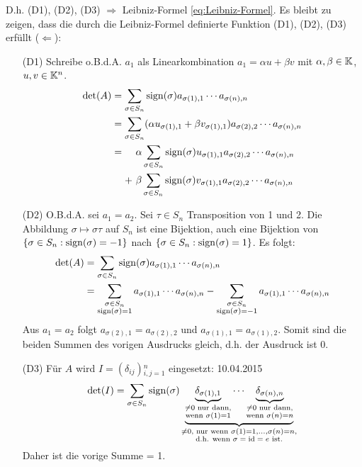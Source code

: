 \noindent D.h. (D1), (D2), (D3) $ \Rightarrow $ Leibniz-Formel \eqref{eq:Leibniz-Formel}. Es bleibt zu zeigen, dass die durch die Leibniz-Formel definierte Funktion (D1), (D2), (D3) erfüllt ($ \Leftarrow $):
\begin{itemize}
	\item[(D1)]
		Schreibe o.B.d.A. $ a_1 $ als Linearkombination $ a_1 = \alpha u + \beta v $ mit $ \alpha, \beta \in \mathbb K $, $ u,v \in \mathbb K^n $.
		\begin{align*}
			\det(A) &= \sum_{\sigma \in S_n} \operatorname{sign}(\sigma) a_{\sigma(1),1} \cdots a_{\sigma(n),n} \\
			&= \sum_{\sigma \in S_n} (\alpha u_{\sigma(1),1} + \beta v_{\sigma(1),1}) a_{\sigma(2),2} \cdots a_{\sigma(n),n} \\
			&= \begin{aligned}[t]
				&\ \alpha \sum_{\sigma \in S_n} \operatorname{sign}(\sigma) u_{\sigma(1),1} a_{\sigma(2),2} \cdots a_{\sigma(n),n} \\
				+ &\ \beta \sum_{\sigma \in S_n} \operatorname{sign}(\sigma) v_{\sigma(1),1} a_{\sigma(2),2} \cdots a_{\sigma(n),n}
			\end{aligned}
		\end{align*}
	\item[(D2)]
		O.B.d.A. sei $ a_1 = a_2 $. Sei $ \tau \in S_n $ Transposition von 1 und 2. Die Abbildung $ \sigma \mapsto \sigma\tau $ auf $ S_n $ ist eine Bijektion, auch eine Bijektion von $ \{ \sigma \in S_n : \operatorname{sign}(\sigma) = -1 \} $ nach $ \{ \sigma \in S_n : \operatorname{sign}(\sigma) = 1 \} $. Es folgt:
		\begin{align*}
			\det(A) &= \sum_{\sigma \in S_n} \operatorname{sign}(\sigma) a_{\sigma(1),1} \cdots a_{\sigma(n),n} \\
			&= \sum_{\substack{\sigma \in S_n \\ \operatorname{sign}(\sigma) = 1}} a_{\sigma(1),1} \cdots a_{\sigma(n),n} - \sum_{\substack{\sigma \in S_n \\ \operatorname{sign}(\sigma) = -1}} a_{\sigma(1),1} \cdots a_{\sigma(n),n}
		\end{align*}
		Aus $ a_1 = a_2 $ folgt $ a_{\sigma(2),1} = a_{\sigma(2),2} $ und $ a_{\sigma(1),1} = a_{\sigma(1),2} $. Somit sind die beiden Summen des vorigen Ausdrucks gleich, d.h. der Ausdruck ist 0.
	\item[(D3)]
		Für $ A $ wird $ I = (\delta_{ij}){}_{i,j=1}^n $ eingesetzt: \hfill 10.04.2015
		\begin{equation*}
			\det(I) = \sum_{\sigma \in S_n} \operatorname{sign}(\sigma) \underbrace{ \underbrace{\delta_{\sigma(1),1}}_{\substack{\neq 0 \text{ nur dann,} \\ \text{wenn } \sigma(1) = 1}} \cdots \underbrace{\delta_{\sigma(n),n}}_{\substack{\neq 0 \text{ nur dann,} \\ \text{wenn } \sigma(n) = n}} }_{\substack{\neq 0 \text{, nur wenn } \sigma(1) = 1, \ldots, \sigma(n) = n, \\ \text{d.h. wenn $ \sigma = \operatorname{id} = e $ ist.}}}
		\end{equation*}
		Daher ist die vorige Summe = 1.
\end{itemize}

